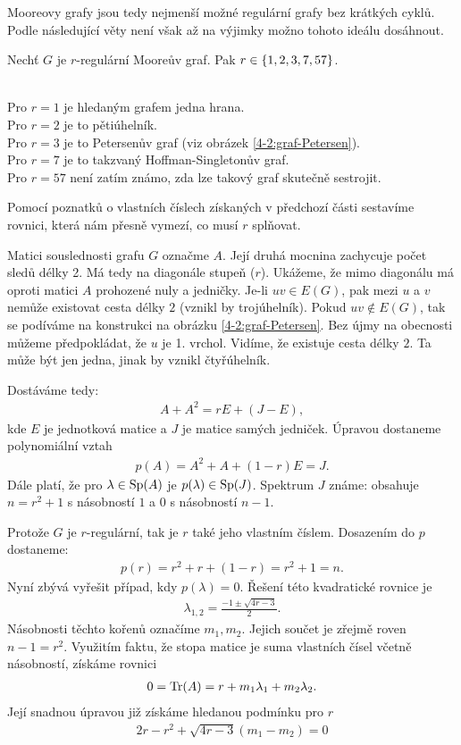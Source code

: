 Mooreovy grafy jsou tedy nejmenší možné regulární grafy bez krátkých cyklů. Podle následující věty není však až na výjimky možno tohoto ideálu dosáhnout.

\vt Nechť $G$ je $r$-regulární Mooreův graf. Pak $r \in \left\{1, 2, 3, 7, 57\right\}$.

\pzn \\
Pro $r = 1$ je hledaným grafem jedna hrana. \\
Pro $r = 2$ je to pětiúhelník. \\
Pro $r = 3$ je to Petersenův graf (viz obrázek \ref{4-2:graf-Petersen}). \\
Pro $r = 7$ je to takzvaný Hoffman-Singletonův graf. \\
Pro $r = 57$ není zatím známo, zda lze takový graf skutečně sestrojit.

\dk
Pomocí poznatků o vlastních číslech získaných v předchozí části sestavíme rovnici, která nám přesně vymezí, co musí $r$ splňovat.

Matici souslednosti grafu $G$ označme $A$. Její druhá mocnina zachycuje počet sledů délky 2. Má tedy na diagonále stupeň ($r$). Ukážeme, že mimo diagonálu má oproti matici $A$ prohozené nuly a jedničky.
Je-li $uv \in E(G)$, pak mezi $u$ a $v$ nemůže existovat cesta délky $2$ (vznikl by trojúhelník).
Pokud $uv \not\in E(G)$, tak se podíváme na konstrukci na obrázku \ref{4-2:graf-Petersen}. Bez újmy na obecnosti můžeme předpokládat, že $u$ je 1. vrchol. Vidíme, že existuje cesta délky $2$. Ta může být jen jedna, jinak by vznikl čtyřúhelník.

Dostáváme tedy:
\begin{align}
A + A^2 = rE + (J - E),
\end{align}
kde $E$ je jednotková matice a $J$ je matice samých jedniček. Úpravou dostaneme polynomiální vztah
\begin{align}
p(A) = A^2 + A + (1-r)E = J.
\end{align}
Dále platí, že pro $\lambda \in \operatorname{Sp}(A)$ je $p(\lambda) \in \operatorname{Sp}(J)$. Spektrum $J$ známe: obsahuje $n = r^2 + 1$ s násobností $1$ a $0$ s násobností $n-1$.

Protože $G$ je $r$-regulární, tak je $r$ také jeho vlastním číslem. Dosazením do $p$ dostaneme:
\begin{align}
p(r)= r^2 + r + (1-r) = r^2 + 1 = n.
\end{align}
Nyní zbývá vyřešit případ, kdy $p(\lambda)=0$.
Řešení této kvadratické rovnice je 
\begin{align}
\lambda_{1,2} = \frac{-1\pm\sqrt{4r-3}}{2}.
\end{align}
Násobnosti těchto kořenů označíme $m_1, m_2$. Jejich součet je zřejmě roven $n-1 = r^2$.
Využitím faktu, že stopa matice je suma vlastních čísel 
včetně násobností, získáme rovnici
\begin{align}
	0 = \operatorname{Tr}(A) = r+m_1\lambda_1 + m_2\lambda_2.
\end{align}
Její snadnou úpravou již získáme hledanou podmínku pro $r$
\begin{align}
2r - r^2 + \sqrt{4r-3}(m_1 - m_2) = 0 \label{4-2:rovnice-pro-r}
\end{align}

